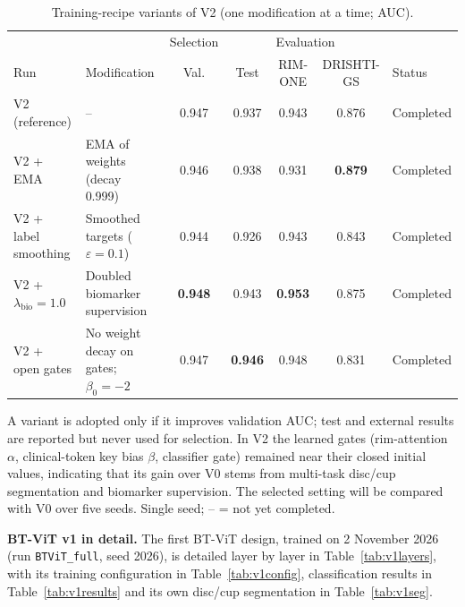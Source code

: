 \documentclass[10pt]{article}
\begin{document}
\begin{table}[h]
\centering
\begin{threeparttable}
\caption{Training-recipe variants of V2 (one modification at a time; AUC).}
\label{tab:experiments}
\small
\setlength{\tabcolsep}{4.5pt}
\begin{tabular}{@{}ll cccc l@{}}
\toprule
 & & \multicolumn{1}{c}{Selection} & \multicolumn{3}{c}{Evaluation} & \\
\cmidrule(lr){3-3} \cmidrule(lr){4-6}
Run & Modification & Val. & Test & RIM-ONE & DRISHTI-GS & Status \\
\midrule
V2 (reference) & -- & 0.947 & 0.937 & 0.943 & 0.876 & Completed \\
V2 + EMA & EMA of weights (decay 0.999) & 0.946 & 0.938 & 0.931 & \textbf{0.879} & Completed \\
V2 + label smoothing & Smoothed targets ($\varepsilon = 0.1$) & 0.944 & 0.926 & 0.943 & 0.843 & Completed \\
V2 + $\lambda_{\mathrm{bio}} = 1.0$ & Doubled biomarker supervision & \textbf{0.948} & 0.943 & \textbf{0.953} & 0.875 & Completed \\
V2 + open gates & No weight decay on gates; $\beta_0 = -2$ & 0.947 & \textbf{0.946} & 0.948 & 0.831 & Completed \\
\bottomrule
\end{tabular}
\begin{tablenotes}\footnotesize
\item[] A variant is adopted only if it improves validation AUC; test and external results are reported but
never used for selection. In V2 the learned gates (rim-attention $\alpha$, clinical-token key bias $\beta$,
classifier gate) remained near their closed initial values, indicating that its gain over V0 stems from
multi-task disc/cup segmentation and biomarker supervision. The selected setting will be compared with V0
over five seeds. Single seed; -- = not yet completed.
\end{tablenotes}
\end{threeparttable}
\end{table}

\clearpage
\noindent\textbf{BT-ViT v1 in detail.} The first BT-ViT design, trained on 2 November 2026 (run
\texttt{BTViT\_full}, seed 2026), is detailed layer by layer in Table~\ref{tab:v1layers}, with its training
configuration in Table~\ref{tab:v1config}, classification results in Table~\ref{tab:v1results} and its own
disc/cup segmentation in Table~\ref{tab:v1seg}.
\end{document}
